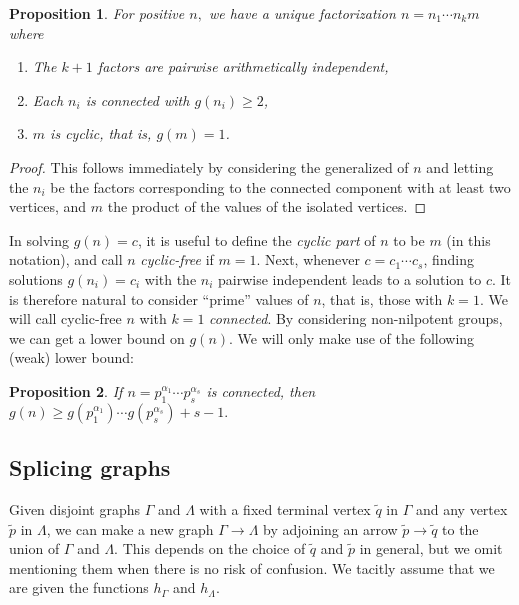 \documentclass[a4paper, 12pt]{article}
\newcommand{\ufdsh}{p_1^{\alpha_1} \cdots p_s^{\alpha_s}}
\newcommand{\qo}{\tilde{q}}
\newcommand{\pin}{\tilde{p}}
\theoremstyle{plain}
\newtheorem{prop}{Proposition}[section]
\theoremstyle{definition}
\begin{document}
\begin{prop}
	For positive $n,$ we have a unique factorization $n = n_1 \cdots n_k m$ where\pagebreak[3]
	\begin{enumerate} \listspace
		\item The $k + 1$ factors are pairwise arithmetically independent,
		\item Each $n_i$ is connected with $g(n_i) \ge 2$,
		\item $m$ is cyclic, that is, $g(m) = 1$.
	\end{enumerate} \textspace
\end{prop}
\begin{proof}
	This follows immediately by considering the generalized  of $n$ and letting the $n_i$ be the factors corresponding to the connected component with at least two vertices, and $m$ the product of the values of the isolated vertices.
\end{proof}

In solving $g(n) = c$, it is useful to define the \emph{cyclic part} of $n$ to be $m$ (in this notation), and call $n$ \emph{cyclic-free} if $m = 1$. Next, whenever $c = c_1 \cdots c_s$, finding solutions $g(n_i) = c_i$ with the $n_i$ pairwise independent leads to a solution to $c$. It is therefore natural to consider ``prime'' values of $n$, that is, those with $k = 1$. We will call cyclic-free $n$ with $k = 1$ \emph{connected}. By considering non-nilpotent groups, we can get a lower bound on $g(n)$. We will only make use of the following (weak) lower bound:

\begin{prop}
	If $n = \ufdsh$ is connected, then $g(n) \ge g(p_1^{\alpha_1})\cdots g(p_s^{\alpha_s}) + s - 1.$
\end{prop}

\subsection{Splicing graphs}
Given disjoint graphs $\Gamma$ and $\Lambda$ with a fixed terminal vertex $\qo$ in $\Gamma$ and any vertex $\pin$ in $\Lambda$, we can make a new graph $\Gamma \rightarrow \Lambda$ by adjoining an arrow $\pin \rightarrow \qo$ to the union of $\Gamma$ and $\Lambda$. This depends on the choice of $\qo$ and $\pin$ in general, but we omit mentioning them when there is no risk of confusion. We tacitly assume that we are given the functions $h_\Gamma$ and $h_\Lambda$.
\end{document}
